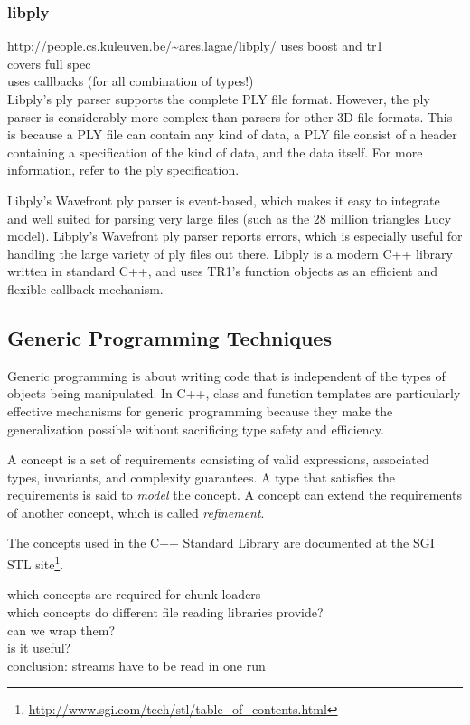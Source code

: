 \documentclass[a4paper,parskip=half]{scrartcl}
\begin{document}
\subsubsection{libply}
\url{http://people.cs.kuleuven.be/~ares.lagae/libply/}
uses boost and tr1\\
covers full spec\\
uses callbacks (for all combination of types!)\\

Libply's ply parser supports the complete PLY file format. However, the ply
parser is considerably more complex than parsers for other 3D file formats. This
is because a PLY file can contain any kind of data, a PLY file consist of a
header containing a specification of the kind of data, and the data itself. For
more information, refer to the ply specification.

Libply's Wavefront ply parser is event-based, which makes it easy to integrate
and well suited for parsing very large files (such as the 28 million triangles
Lucy model). Libply's Wavefront ply parser reports errors, which is especially
useful for handling the large variety of ply files out there. Libply is a modern
C++ library written in standard C++, and uses TR1's function objects as an
efficient and flexible callback mechanism.

\subsection{Generic Programming Techniques}
Generic programming is about writing code that is independent of the types of
objects being manipulated. In C++, class and function templates are particularly
effective mechanisms for generic programming because they make the generalization
possible without sacrificing type safety and efficiency.

A concept is a set of requirements consisting of valid expressions, associated
types, invariants, and complexity guarantees. A type that satisfies the
requirements is said to \emph{model} the concept. A concept can extend the
requirements of another concept, which is called \emph{refinement}.

The concepts used in the C++ Standard Library are documented at the SGI STL
site\footnote{\url{http://www.sgi.com/tech/stl/table_of_contents.html}}.

which concepts are required for chunk loaders\\
which concepts do different file reading libraries provide?\\
can we wrap them?\\
is it useful?\\
conclusion: streams have to be read in one run\\
\end{document}
